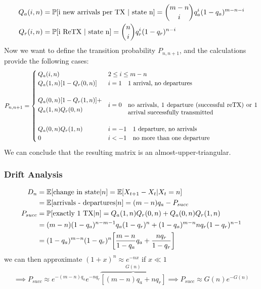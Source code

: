 \begin{equation}\begin{split}
	Q_a(i,n) &= \mathbb{P}[\text{i new arrivals per TX | state n}] = \binom{m-n}{i} q_a^i (1-q_a)^{m-n-i} \\
	Q_r(i,n) &= \mathbb{P}[\text{i ReTX | state n}] = \binom{n}{i} q_r^i (1-q_r)^{n-i} \\
\end{split}\end{equation}
Now we want to define the transition probability $P_{n,n+1}$, and the calculations provide the following cases:
\begin{equation}
	P_{n,n+1} = \begin{cases}
	 Q_a(i,n) & 2 \le i \le m-n \\
	 Q_a(1,n) [1-Q_r(0,n)] & i=1 \quad \text{1 arrival, no departures}\\\\
	 \begin{aligned}
	 & Q_a(0,n) [1-Q_r(1,n)] + \\ & Q_a(1,n) Q_r(0,n)
	 \end{aligned}& i=0 \quad \parbox[t]{0.6\textwidth}{no arrivals, 1 departure (successful reTX) or 1 arrival successfully transmitted }\\\\
	 Q_a(0,n) Q_r(1,n) & i = -1 \quad \text{1 departure, no arrivals}\\
	 0 & i < -1 \quad \text{no more than one departure}
	\end{cases}
\end{equation}
We can conclude that the resulting matrix is an almost-upper-triangular.

\subsubsection{Drift Analysis}
\begin{equation}
	\begin{split}
		D_n &= \mathbb{E}[\text{change in state} | n] = \mathbb{E}[X_{t+1} - X_t | X_t = n] \\
		&= \mathbb{E}[\text{arrivals - departures} | n ] = (m-n) q_a - P_{succ} \\
		P_{succ}&= \mathbb{P}[\text{exactly 1 TX}|n] = Q_a(1,n) Q_r(0,n) + Q_a(0,n) Q_r(1,n) \\
		&= (m-n)(1-q_a)^{n-m-1} q_a (1-q_r)^n + (1-q_a)^{m-n} n q_r (1-q_r)^{n-1} \\
		&= (1-q_a)^{m-n} (1-q_r)^n \bigg[\frac{m-n}{1-q_a} q_a + \frac{n q_r}{1-q_r}\bigg]
	\end{split}
\end{equation}
we can then approximate $(1+x)^n \approx e^{-n x}$ if $x \ll 1$
\begin{equation}
	\implies P_{succ} \approx e^{-(m-n) q_a} e^{-n q_r} \overbrace{[(m-n) q_a + n q_r]}^{G(n)}
	\implies P_{succ} \approx G(n)e^{-G(n)}
\end{equation}

